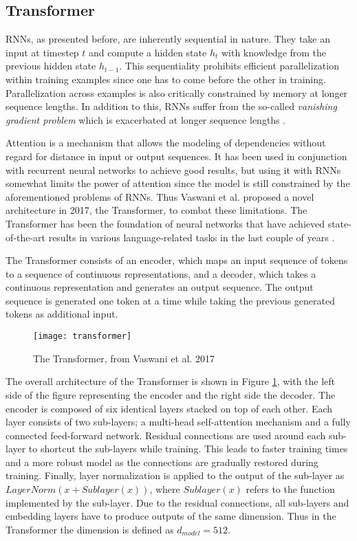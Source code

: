 \subsection{Transformer} \label{Transformer}
RNNs, as presented before, are inherently sequential in nature.
They take an input at timestep $t$ and compute a hidden state $h_t$ with knowledge from the previous hidden state $h_{t-1}$.
This sequentiality prohibits efficient parallelization within training examples since one has to come before the other in training.
Parallelization across examples is also critically constrained by memory at longer sequence lengths.
In addition to this, RNNs suffer from the so-called \textit{vanishing gradient problem} which is exacerbated at longer sequence lengths \cite{vaswani2017}.

Attention is a mechanism that allows the modeling of dependencies without regard for distance in input or output sequences.
It has been used in conjunction with recurrent neural networks to achieve good results, but using it with RNNs somewhat limits the power of attention since the model is still constrained by the aforementioned problems of RNNs.
Thus Vaswani et al. proposed a novel architecture in 2017, the Transformer, to combat these limitations.
The Transformer has been the foundation of neural networks that have achieved state-of-the-art results in various language-related tasks in the last couple of years \cite{vaswani2017}.

The Transformer consists of an encoder, which maps an input sequence of tokens to a sequence of continuous representations, and a decoder, which takes a continuous representation and generates an output sequence.
The output sequence is generated one token at a time while taking the previous generated tokens as additional input.

\begin{figure}[t]
\texttt{[image: transformer]}
\centering
\caption{The Transformer, from Vaswani et al. 2017 \cite{vaswani2017}}
\label{fig:transformer}
\end{figure}

The overall architecture of the Transformer is shown in Figure \ref{fig:transformer}, with the left side of the figure representing the encoder and the right side the decoder.
The encoder is composed of six identical layers stacked on top of each other.
Each layer consists of two sub-layers; a multi-head self-attention mechanism and a fully connected feed-forward network.
Residual connections \cite{he2016} are used around each sub-layer to shortcut the sub-layers while training.
This leads to faster training times and a more robust model as the connections are gradually restored during training.
Finally, layer normalization is applied to the output of the sub-layer as $LayerNorm(x+Sublayer(x))$, where $Sublayer(x)$ refers to the function implemented by the sub-layer.
Due to the residual connections, all sub-layers and embedding layers have to produce outputs of the same dimension.
Thus in the Transformer the dimension is defined as $d_{model}=512$.

